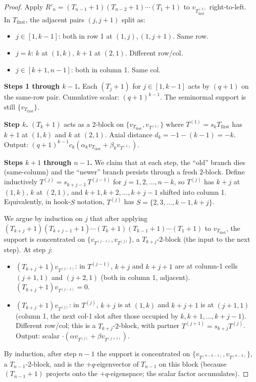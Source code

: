 \documentclass[11pt]{article}
\theoremstyle{definition}
\begin{document}
\begin{proof}
Apply $R'_n = (T_{n-1}{+}1)(T_{n-2}{+}1)\cdots(T_1{+}1)$ to
$v_{T_{\mathrm{first}}^{(\lambda)}}$ right-to-left.  In
$T_{\mathrm{first}}$, the adjacent pairs $(j, j{+}1)$ split as:
\begin{itemize}[leftmargin=2em,topsep=0.2em,itemsep=0.1em]
\item $j \in [1, k-1]$: both in row 1 at $(1, j), (1, j{+}1)$.  Same row.
\item $j = k$: $k$ at $(1, k)$, $k{+}1$ at $(2, 1)$.  Different row/col.
\item $j \in [k+1, n-1]$: both in column 1.  Same col.
\end{itemize}

\textbf{Steps 1 through $k-1$.}  Each $(T_j{+}1)$ for $j \in [1, k-1]$
acts by $(q{+}1)$ on the same-row pair.  Cumulative scalar:
$(q+1)^{k-1}$.  The seminormal support is still $\{v_{T_{\mathrm{first}}}\}$.

\textbf{Step $k$.}  $(T_k{+}1)$ acts as a $2$-block on
$\{v_{T_{\mathrm{first}}}, v_{T^{(1)}}\}$ where $T^{(1)} = s_k T_{\mathrm{first}}$
has $k+1$ at $(1, k)$ and $k$ at $(2, 1)$.  Axial distance
$d_k = -1 - (k-1) = -k$.  Output:
$(q+1)^{k-1} c_k (\alpha_k v_{T_{\mathrm{first}}} + \beta_k v_{T^{(1)}})$.

\textbf{Steps $k+1$ through $n-1$.}  We claim that at each step, the
``old'' branch dies (same-column) and the ``newer'' branch persists
through a fresh $2$-block.  Define inductively $T^{(j)} = s_{k+j-1}\,T^{(j-1)}$
for $j = 1, 2, \ldots, n-k$, so $T^{(j)}$ has $k+j$ at $(1, k)$, $k$ at
$(2, 1)$, and $k+1, k+2, \ldots, k+j-1$ shifted into column 1.
Equivalently, in hook-$S$ notation, $T^{(j)}$ has
$S = \{2, 3, \ldots, k-1, k+j\}$.

We argue by induction on $j$ that after applying
$(T_{k+j}{+}1)(T_{k+j-1}{+}1)\cdots(T_k{+}1)(T_{k-1}{+}1)\cdots(T_1{+}1)$
to $v_{T_{\mathrm{first}}}$, the support is concentrated on
$\{v_{T^{(j-1)}}, v_{T^{(j)}}\}$, a $T_{k+j}$-$2$-block (the input to
the next step).  At step $j$:
\begin{itemize}[leftmargin=2em,topsep=0.2em,itemsep=0.1em]
\item $(T_{k+j}{+}1) v_{T^{(j-1)}}$: in $T^{(j-1)}$, $k+j$ and $k+j+1$
are at column-1 cells $(j+1, 1)$ and $(j+2, 1)$ (both in column 1,
adjacent).  $(T_{k+j}{+}1) v_{T^{(j-1)}} = 0$.
\item $(T_{k+j}{+}1) v_{T^{(j)}}$: in $T^{(j)}$, $k+j$ is at $(1, k)$
and $k+j+1$ is at $(j+1, 1)$ (column 1, the next col-1 slot after
those occupied by $k, k+1, \ldots, k+j-1$).  Different row/col; this
is a $T_{k+j}$-$2$-block, with partner $T^{(j+1)} = s_{k+j} T^{(j)}$.
Output: scalar $\cdot (\alpha v_{T^{(j)}} + \beta v_{T^{(j+1)}})$.
\end{itemize}
By induction, after step $n-1$ the support is concentrated on
$\{v_{T^{(n-k-1)}}, v_{T^{(n-k)}}\}$, a $T_{n-1}$-$2$-block, and is the
$+q$-eigenvector of $T_{n-1}$ on this block (because $(T_{n-1}{+}1)$
projects onto the $+q$-eigenspace; the scalar factor accumulates).


\end{proof}
\end{document}
